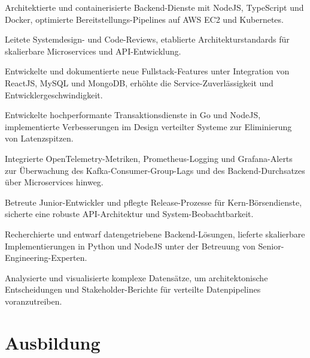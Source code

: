 \documentclass[10pt,a4paper]{resume}
\begin{document}
\bullets
  \item Architektierte und containerisierte Backend-Dienste mit NodeJS, TypeScript und Docker, optimierte Bereitstellungs-Pipelines auf AWS EC2 und Kubernetes.
  \item Leitete Systemdesign- und Code-Reviews, etablierte Architekturstandards für skalierbare Microservices und API-Entwicklung.
  \item Entwickelte und dokumentierte neue Fullstack-Features unter Integration von ReactJS, MySQL und MongoDB, erhöhte die Service-Zuverlässigkeit und Entwicklergeschwindigkeit.
\bulletsend
\vspace{1.5pt}
\bullets
  \item Entwickelte hochperformante Transaktionsdienste in Go und NodeJS, implementierte Verbesserungen im Design verteilter Systeme zur Eliminierung von Latenzspitzen.
  \item Integrierte OpenTelemetry-Metriken, Prometheus-Logging und Grafana-Alerts zur Überwachung des Kafka-Consumer-Group-Lags und des Backend-Durchsatzes über Microservices hinweg.
  \item Betreute Junior-Entwickler und pflegte Release-Prozesse für Kern-Börsendienste, sicherte eine robuste API-Architektur und System-Beobachtbarkeit.
\bulletsend
\vspace{1.5pt}
\bullets
  \item Recherchierte und entwarf datengetriebene Backend-Lösungen, lieferte skalierbare Implementierungen in Python und NodeJS unter der Betreuung von Senior-Engineering-Experten.
  \item Analysierte und visualisierte komplexe Datensätze, um architektonische Entscheidungen und Stakeholder-Berichte für verteilte Datenpipelines voranzutreiben.
\bulletsend
\vspace{1.5pt}

\section{Ausbildung}

\vspace{2pt}
\end{document}
